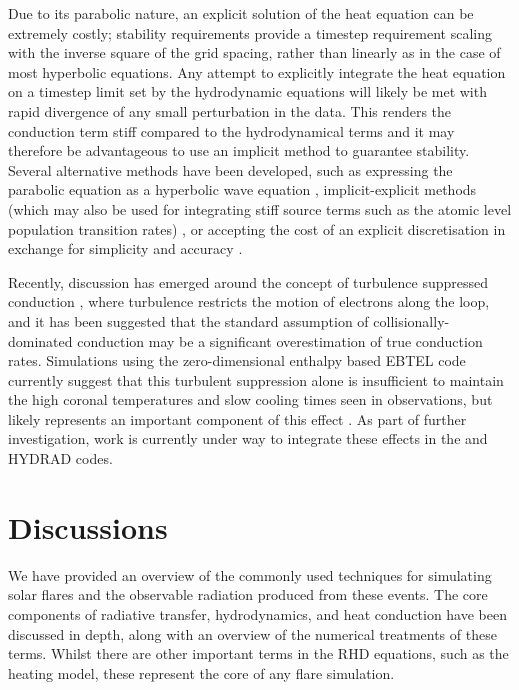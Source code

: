 Due to its parabolic nature, an explicit solution of the heat equation can be extremely costly; stability requirements provide a timestep requirement scaling with the inverse square of the grid spacing, rather than linearly as in the case of most hyperbolic equations.
Any attempt to explicitly integrate the heat equation on a timestep limit set by the hydrodynamic equations will likely be met with rapid divergence of any small perturbation in the data.
This renders the conduction term stiff compared to the hydrodynamical terms and it may therefore be advantageous to use an implicit method  to guarantee stability.
Several alternative methods have been developed, such as expressing the parabolic equation as a hyperbolic wave equation \citep{Rempel2016}, implicit-explicit methods (which may also be used for integrating stiff source terms such as the atomic level population transition rates) \citep[e.g.][]{Ascher1995}, or accepting the cost of an explicit discretisation in exchange for simplicity and accuracy \citep{Bradshaw2003, Bradshaw2013}.

Recently, discussion has emerged around the concept of turbulence suppressed conduction \citep{Bian2016}, where turbulence restricts the motion of electrons along the loop, and it has been suggested that the standard assumption of collisionally-dominated conduction may be a significant overestimation of true conduction rates.
Simulations using the zero-dimensional enthalpy based EBTEL code \NeedRef{} currently suggest that this turbulent suppression alone is insufficient to maintain the high coronal temperatures and slow cooling times seen in observations, but likely represents an important component of this effect \citep{Bian2018}.
As part of further investigation, work is currently under way to integrate these effects in the \Radyn{} and HYDRAD codes.

\section{Discussions}

We have provided an overview of the commonly used techniques for simulating solar flares and the observable radiation produced from these events.
The core components of radiative transfer, hydrodynamics, and heat conduction have been discussed in depth, along with an overview of the numerical treatments of these terms.
Whilst there are other important terms in the RHD equations, such as the heating model, these represent the core of any flare simulation.

